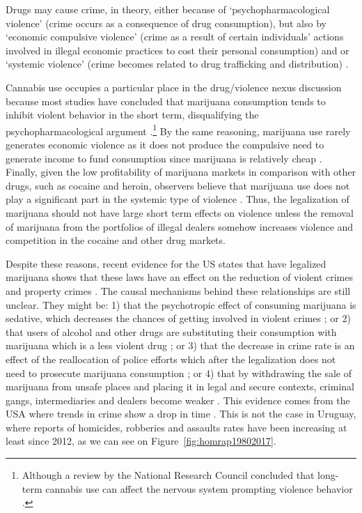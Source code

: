 \documentclass[11pt]{article}
\begin{document}
Drugs may cause crime, in theory, either because of ‘psychopharmacological violence’ (crime occurs as a consequence of drug consumption), but also by ‘economic compulsive violence’ (crime as a result of certain individuals’ actions involved in illegal economic practices to cost their personal consumption) and or ‘systemic violence’ (crime becomes related to drug trafficking and distribution) \citep{goldstein1985drugs}.

Cannabis use occupies a particular place in the drug/violence nexus discussion because most studies have concluded that marijuana consumption tends to inhibit violent behavior in the short term, disqualifying the psychopharmacological argument \citep{white2000dynamics}.\footnote{Although a review by the National Research Council concluded that long-term cannabis use can affect the nervous system prompting violence behavior \citep{national1994understanding}.} By the same reasoning, marijuana use rarely generates economic violence as it does not produce the compulsive need to generate income to fund consumption since marijuana is relatively cheap \citep{caulkins2016marijuana}. Finally, given the low profitability of marijuana markets in comparison with other drugs, such as cocaine and heroin, observers believe that marijuana use does not play a significant part in the systemic type of violence \citep{pacula2003marijuana, caulkins2015considering}. Thus, the legalization of marijuana should not have large short term effects on violence unless the removal of marijuana from the portfolios of illegal dealers somehow increases violence and competition in the cocaine and other drug markets.

Despite these reasons, recent evidence for the US states that have legalized marijuana shows that these laws have an effect on the reduction of violent crimes and property crimes \citep{dragone2019crime, Indigo:2016, gavrilova2014legal, huber2016cannabis,brinkman2019not, hao2017cross}. The causal mechanisms behind these relationships are still unclear. They might be: 1) that the psychotropic effect of consuming marijuana is sedative, which decreases the chances of getting involved in violent crimes \citep{no2001health, green2003being}; or 2) that users of alcohol and other drugs are substituting their consumption with marijuana which is a less violent drug \citep{anderson2014legalization, kelly2014policing} ; or 3) that the decrease in crime rate is an effect of the reallocation of police efforts which after the legalization does not need to prosecute marijuana consumption \citep{adda2014crime}; or 4) that by withdrawing the sale of marijuana from unsafe places and placing it in legal and secure contexts, criminal gangs, intermediaries and dealers become weaker \citep{becker2013have}. This evidence comes from the USA where trends in crime show a drop in time \citep{gramlich5facts, james2018recent}. This is not the case in Uruguay, where reports of homicides, robberies and assaults rates have been increasing at least since 2012, as we can see on Figure~\ref{fig:homrap19802017}.
\end{document}
